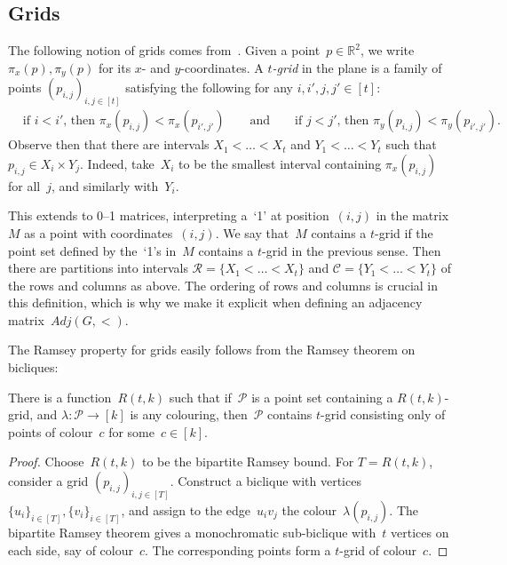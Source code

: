 \documentclass[a4paper,UKenglish,cleveref,thm-restate]{lipics-v2021}
\theoremstyle{remark}
\newcommand{\Cc}{\mathcal{C}}
\newcommand{\Pc}{\mathcal{P}}
\newcommand{\Rc}{\mathcal{R}}
\newcommand{\R}{\mathbb{R}}
\newcommand{\Xco}{\pi_x}
\newcommand{\Yco}{\pi_y}
\newcommand{\adj}{Adj}
\begin{document}
\subsection{Grids}
\label{subsec:grids}
The following notion of grids comes from~\cite{GuillemotMarx}.
Given a point~$p \in \R^2$, we write $\Xco(p),\Yco(p)$ for its $x$- and $y$-coordinates.
A \emph{$t$-grid} in the plane is a family of points $(p_{i,j})_{i,j \in [t]}$ satisfying the following for any $i,i',j,j' \in [t]$:
\begin{align*}
    & \text{if $i<i'$, then $\Xco(p_{i,j}) < \Xco(p_{i',j'})$}
    \qquad \text{and} \qquad \text{if $j<j'$, then $\Yco(p_{i,j}) < \Yco(p_{i',j'})$.}
\end{align*}
Observe then that there are intervals $X_1 < \dots < X_t$ and $Y_1 < \dots < Y_t$ such that $p_{i,j} \in X_i \times Y_j$.
Indeed, take~$X_i$ to be the smallest interval containing $\Xco(p_{i,j})$ for all~$j$, and similarly with~$Y_i$.

This extends to 0--1 matrices, interpreting a~`1' at position~$(i,j)$ in the matrix~$M$ as a point with coordinates~$(i,j)$.
We say that~$M$ contains a $t$-grid if the point set defined by the~`1's in~$M$ contains a $t$-grid in the previous sense.
Then there are partitions into intervals $\Rc = \{X_1 < \dots < X_t\}$ and $\Cc = \{Y_1 < \dots < Y_t\}$ of the rows and columns as above.
The ordering of rows and columns is crucial in this definition, which is why we make it explicit when defining an adjacency matrix~$\adj(G,<)$.

The Ramsey property for grids easily follows from the Ramsey theorem on bicliques:
\begin{theorem}\label{thm:grid-ramsey}
    There is a function~$R(t,k)$ such that if~$\Pc$ is a point set containing a $R(t,k)$-grid,
    and $\lambda : \Pc \to [k]$ is any colouring, then~$\Pc$ contains $t$-grid consisting only of points of colour~$c$ for some~$c \in [k]$.
\end{theorem}
\begin{proof}
    Choose~$R(t,k)$ to be the bipartite Ramsey bound.
    For $T = R(t,k)$, consider a grid $(p_{i,j})_{i,j \in [T]}$.
    Construct a biclique with vertices $\{u_i\}_{i \in [T]},\{v_i\}_{i \in [T]}$, and assign to the edge~$u_iv_j$ the colour~$\lambda(p_{i,j})$.
    The bipartite Ramsey theorem gives a monochromatic sub-biclique with~$t$ vertices on each side, say of colour~$c$.
    The corresponding points form a $t$-grid of colour~$c$.
\end{proof}
\end{document}
